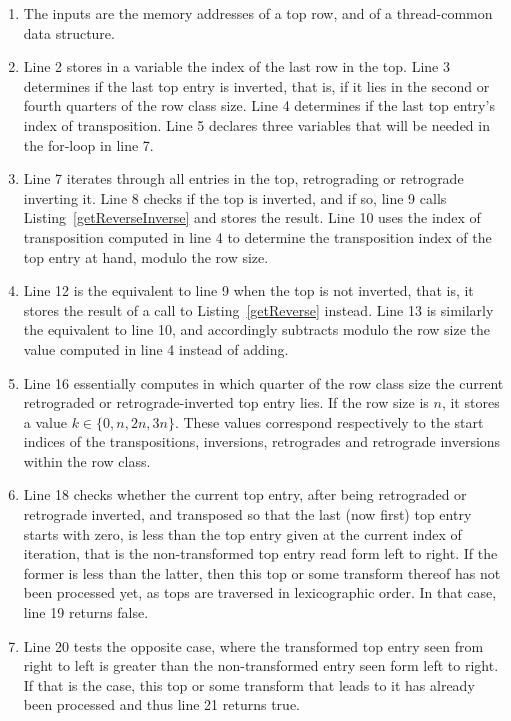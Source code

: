 \begin{enumerate}
\item The inputs are the memory addresses of a top row, and of a thread-common data structure.
\item Line 2 stores in a variable the index of the last row in the top. Line 3 determines if the last top entry is inverted, that is, if it lies in the second or fourth quarters of the row class size. Line 4 determines if the last top entry's index of transposition. Line 5 declares three variables that will be needed in the for-loop in line 7.
\addtocounter{enumi}{4}
\item Line 7 iterates through all entries in the top, retrograding or retrograde inverting it. Line 8 checks if the top is inverted, and if so, line 9 calls Listing~\ref{getReverseInverse} and stores the result. Line 10 uses the index of transposition computed in line 4 to determine the transposition index of the top entry at hand, modulo the row size.
\addtocounter{enumi}{4}
\item Line 12 is the equivalent to line 9 when the top is not inverted, that is, it stores the result of a call to Listing~\ref{getReverse} instead. Line 13 is similarly the equivalent to line 10, and accordingly subtracts modulo the row size the value computed in line 4 instead of adding.
\addtocounter{enumi}{3}
\item Line 16 essentially computes in which quarter of the row class size the current retrograded or retrograde-inverted top entry lies. If the row size is $n$, it stores a value $k \in \{0, n, 2n, 3n\}$. These values correspond respectively to the start indices of the transpositions, inversions, retrogrades and retrograde inversions within the row class.
\addtocounter{enumi}{1}
\item Line 18 checks whether the current top entry, after being retrograded or retrograde inverted, and transposed so that the last (now first) top entry starts with zero, is less than the top entry given at the current index of iteration, that is the non-transformed top entry read form left to right. If the former is less than the latter, then this top or some transform thereof has not been processed yet, as tops are traversed in lexicographic order. In that case, line 19 returns false.
\addtocounter{enumi}{1}
\item Line 20 tests the opposite case, where the transformed top entry seen from right to left is greater than the non-transformed entry seen form left to right. If that is the case, this top or some transform that leads to it has already been processed and thus line 21 returns true.

\end{enumerate}
